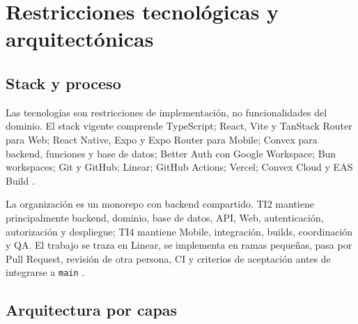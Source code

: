 \documentclass[10pt,a4paper,oneside]{article}
\begin{document}
\section{Restricciones tecnológicas y arquitectónicas}

\subsection{Stack y proceso}

Las tecnologías son restricciones de implementación, no funcionalidades del dominio. El stack vigente comprende TypeScript; React, Vite y TanStack Router para Web; React Native, Expo y Expo Router para Mobile; Convex para backend, funciones y base de datos; Better Auth con Google Workspace; Bun workspaces; Git y GitHub; Linear; GitHub Actions; Vercel; Convex Cloud y EAS Build \citep{tech,git}.

La organización es un monorepo con backend compartido. TI2 mantiene principalmente backend, dominio, base de datos, API, Web, autenticación, autorización y despliegue; TI4 mantiene Mobile, integración, builds, coordinación y QA. El trabajo se traza en Linear, se implementa en ramas pequeñas, pasa por Pull Request, revisión de otra persona, CI y criterios de aceptación antes de integrarse a \texttt{main} \citep{git,metodologia}.

\subsection{Arquitectura por capas}

\begin{center}
\end{center}
\end{document}
